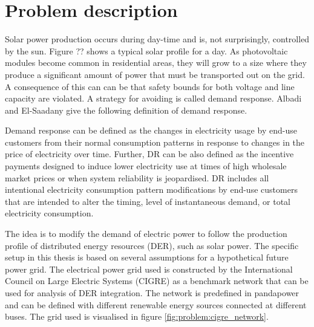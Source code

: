 \documentclass[class=book, crop=false]{standalone}
\begin{document}
\section{Problem description}
Solar power production occurs during day-time and is, not surprisingly, controlled by the sun. Figure ?? shows a typical solar profile for a day. As photovoltaic modules become common in residential areas, they will grow to a size where they produce a significant amount of power that must be transported out on the grid. A consequence of this can can be that safety bounds for both voltage and line capacity are violated. A strategy for avoiding is called demand response. Albadi and El-Saadany give the following definition of demand response.\cite{demand_response_definition}

\begin{displayquote}
Demand response can be defined as the changes in electricity usage by end-use customers from their normal consumption patterns in response to changes in the price of electricity over time. Further, DR can be also defined as the incentive payments designed to induce lower electricity use at times of high wholesale market prices or when system reliability is jeopardised. DR includes all intentional electricity consumption pattern modifications by end-use customers that are intended to alter the timing, level of
instantaneous demand, or total electricity consumption.
\end{displayquote}


The idea is to modify the demand of electric power to follow the production profile of distributed energy resources (DER), such as solar power. The specific setup in this thesis is based on several assumptions for a hypothetical future power grid. The electrical power grid used is constructed by the International Council on Large Electric Systems (CIGRE) as a benchmark network that can be used for analysis of DER integration\cite{cigre}. The network is predefined in pandapower and can be defined with different renewable energy sources connected at different buses. The grid used is visualised in figure \ref{fig:problem:cigre_network}. 
\end{document}
